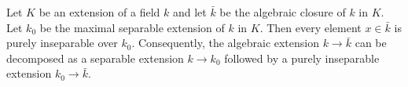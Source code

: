 Let $K$ be an extension of a field $k$ and let $\bar{k}$ be the algebraic closure of $k$ in $K$. Let $k_0$ be the maximal separable extension of $k$ in $K$. Then every element $x \in \bar{k}$ is purely inseparable over $k_0$. Consequently, the algebraic extension $k \to \bar{k}$ can be decomposed as a separable extension $k \to k_0$ followed by a purely inseparable extension $k_0 \to \bar{k}$.
